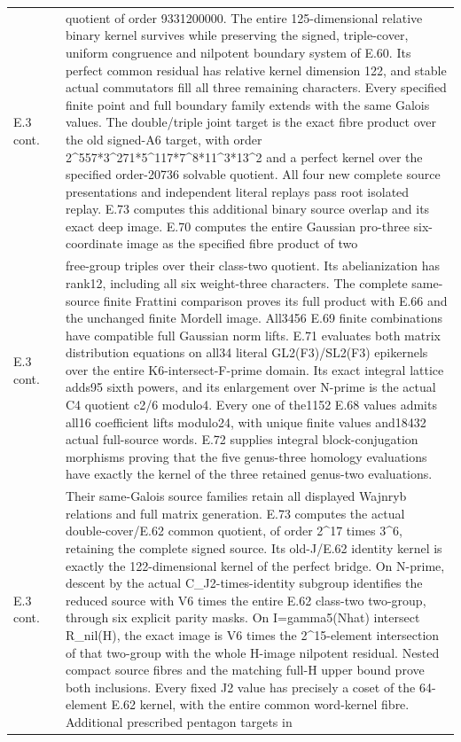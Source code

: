 \begin{longtable}{@{}p{1.1cm}p{3.0cm}p{10.3cm}@{}}
E.3 cont. &  & quotient of order 9331200000. The entire 125-dimensional relative binary kernel survives while preserving the signed, triple-cover, uniform congruence and nilpotent boundary system of E.60. Its perfect common residual has relative kernel dimension 122, and stable actual commutators fill all three remaining characters. Every specified finite point and full boundary family extends with the same Galois values. The double/triple joint target is the exact fibre product over the old signed-A6 target, with order 2\textasciicircum{}557*3\textasciicircum{}271*5\textasciicircum{}117*7\textasciicircum{}8*11\textasciicircum{}3*13\textasciicircum{}2 and a perfect kernel over the specified order-20736 solvable quotient. All four new complete source presentations and independent literal replays pass root isolated replay. E.73 computes this additional binary source overlap and its exact deep image. E.70 computes the entire Gaussian pro-three six-coordinate image as the specified fibre product of two  \\
E.3 cont. &  & free-group triples over their class-two quotient. Its abelianization has rank12, including all six weight-three characters. The complete same-source finite Frattini comparison proves its full product with E.66 and the unchanged finite Mordell image. All3456 E.69 finite combinations have compatible full Gaussian norm lifts. E.71 evaluates both matrix distribution equations on all34 literal GL2(F3)/SL2(F3) epikernels over the entire K6-intersect-F-prime domain. Its exact integral lattice adds95 sixth powers, and its enlargement over N-prime is the actual C4 quotient c2/6 modulo4. Every one of the1152 E.68 values admits all16 coefficient lifts modulo24, with unique finite values and18432 actual full-source words. E.72 supplies integral block-conjugation morphisms proving that the five genus-three homology evaluations have exactly the kernel of the three retained genus-two evaluations.  \\
E.3 cont. &  & Their same-Galois source families retain all displayed Wajnryb relations and full matrix generation. E.73 computes the actual double-cover/E.62 common quotient, of order 2\textasciicircum{}17 times 3\textasciicircum{}6, retaining the complete signed source. Its old-J/E.62 identity kernel is exactly the 122-dimensional kernel of the perfect bridge. On N-prime, descent by the actual C\_J2-times-identity subgroup identifies the reduced source with V6 times the entire E.62 class-two two-group, through six explicit parity masks. On I=gamma5(Nhat) intersect R\_nil(H), the exact image is V6 times the 2\textasciicircum{}15-element intersection of that two-group with the whole H-image nilpotent residual. Nested compact source fibres and the matching full-H upper bound prove both inclusions. Every fixed J2 value has precisely a coset of the 64-element E.62 kernel, with the entire common word-kernel fibre. Additional prescribed pentagon targets in  \\

\end{longtable}
